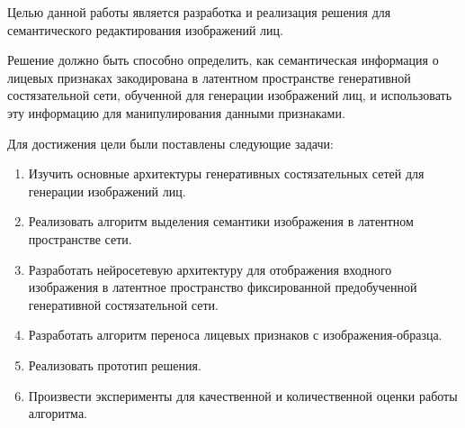 Целью данной работы является разработка и реализация решения для семантического редактирования изображений лиц. 

Решение должно быть способно определить, как семантическая информация о лицевых признаках закодирована в латентном пространстве генеративной состязательной сети, обученной для генерации изображений лиц, и использовать эту информацию для манипулирования данными признаками.

Для достижения цели были поставлены следующие задачи:

\begin{enumerate}
\item  Изучить основные архитектуры генеративных состязательных сетей для генерации изображений лиц.
\item  Реализовать алгоритм выделения семантики изображения в латентном пространстве сети.
\item  Разработать нейросетевую архитектуру для отображения входного изображения в латентное пространство фиксированной предобученной генеративной состязательной сети.
\item  Разработать алгоритм переноса лицевых признаков с изображения-образца.
\item  Реализовать прототип решения.
\item  Произвести эксперименты для качественной и количественной оценки работы алгоритма.
\end{enumerate}
